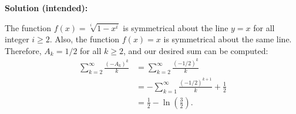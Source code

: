 
\begin{solution}
\textbf{Solution (intended)}\textbf{:}\V

The function $f(x) = \sqrt[i]{1-x^i}$ is symmetrical about the line $y=x$ for all integer $i\geq 2$. Also, the function $f(x)=x$ is symmetrical about the same line. Therefore, $A_k = 1/2$ for all $k\geq 2$, and our desired sum can be computed: 
\begin{align*}
    \sum_{k=2}^{\infty} \frac{(-A_k)^k}{k} &= \sum_{k=2}^{\infty} \frac{(-1/2)^k}{k} \\
    &= -\sum_{k=1}^{\infty} \frac{(-1/2)^{k+1}}{k} + \frac{1}{2} \\
    &= \frac{1}{2} - \ln{\left(\frac{3}{2}\right)}.
\end{align*}
\end{solution}\V
